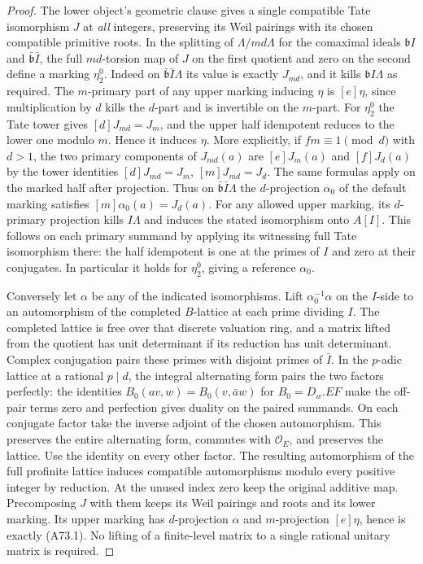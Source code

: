 \begin{proof}
The lower object's geometric clause gives a single compatible Tate
isomorphism $J$ at \emph{all} integers, preserving its Weil pairings
with its chosen compatible primitive roots. In the splitting of
$\Lambda/md\Lambda$ for the comaximal ideals
$\mathfrak b I$ and $\bar{\mathfrak b}\bar I$, the full $md$-torsion
map of $J$ on the first quotient and zero on the second define a
marking $\eta_2^0$. Indeed on
$\bar{\mathfrak b}\bar I\Lambda$ its value is exactly $J_{md}$,
and it kills $\mathfrak b I\Lambda$ as required.
The $m$-primary part of any upper marking inducing $\eta$ is
$[e]\eta$, since multiplication by $d$ kills the $d$-part and is
invertible on the $m$-part. For $\eta_2^0$ the Tate tower gives
$[d]J_{md}=J_m$, and the upper half idempotent reduces to the
lower one modulo $m$. Hence it induces $\eta$. More explicitly,
if $f m\equiv1\pmod d$ with $d>1$, the two primary components
of $J_{md}(a)$ are $[e]J_m(a)$ and $[f]J_d(a)$ by the tower
identities $[d]J_{md}=J_m$, $[m]J_{md}=J_d$. The same formulas
apply on the marked half after projection. Thus on
$\bar{\mathfrak b}\bar I\Lambda$ the $d$-projection $\alpha_0$
of the default marking satisfies $[m]\alpha_0(a)=J_d(a)$.
For any allowed upper marking, its $d$-primary projection kills
$I\Lambda$ and induces the stated isomorphism onto $A[I]$.
This follows on each primary summand by applying its witnessing
full Tate isomorphism there: the half idempotent is one at the primes
of $I$ and zero at their conjugates. In particular it holds for
$\eta_2^0$, giving a reference $\alpha_0$.

Conversely let $\alpha$ be any of the indicated isomorphisms.
Lift $\alpha_0^{-1}\alpha$ on the $I$-side to an automorphism
of the completed $B$-lattice at each prime dividing $I$. The
completed lattice is free over that discrete valuation ring, and
a matrix lifted from the quotient has unit determinant if its
reduction has unit determinant. Complex conjugation pairs these
primes with disjoint primes of $\bar I$. In the $p$-adic lattice
at a rational $p\mid d$, the integral alternating form pairs the
two factors perfectly: the identities
$B_0(av,w)=B_0(v,\bar a w)$ for $B_0=D_w.EF$ make the off-pair
terms zero and perfection gives duality on the paired summands.
On each conjugate factor take the inverse adjoint of the chosen
automorphism. This preserves the entire alternating form, commutes
with $\mathcal O_E$, and preserves the lattice. Use the identity
on every other factor. The resulting automorphism of the full
profinite lattice induces compatible automorphisms modulo every
positive integer by reduction. At the unused index zero keep
the original additive map. Precomposing $J$ with them keeps its Weil
pairings and roots and its lower marking. Its upper marking has
$d$-projection $\alpha$ and $m$-projection $[e]\eta$, hence is
exactly (A73.1). No lifting of a finite-level matrix to a single
rational unitary matrix is required.
\end{proof}

